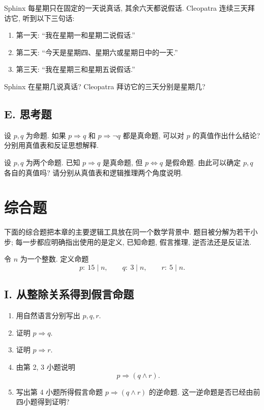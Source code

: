 \documentclass[usesamecnt, thmcnt=section, lang=cn, newtx, 10pt, scheme=chinese]{elegantbook}
\begin{document}
\begin{exercise}
\label{ex:basic-logic-18}
Sphinx 每星期只在固定的一天说真话, 其余六天都说假话. Cleopatra 连续三天拜访它, 听到以下三句话:
\begin{enumerate}[label=\rm(\arabic*)]
  \item 第一天: ``我在星期一和星期二说假话.''
  \item 第二天: ``今天是星期四、星期六或星期日中的一天.''
  \item 第三天: ``我在星期三和星期五说假话.''
\end{enumerate}
Sphinx 在星期几说真话? Cleopatra 拜访它的三天分别是星期几?
\end{exercise}

\subsection*{E. 思考题}

\begin{challenge}
\label{ch:logic-05}
设 $p,q$ 为命题. 如果 $p\Rightarrow q$ 和 $p\Rightarrow\neg q$ 都是真命题, 可以对 $p$ 的真值作出什么结论? 分别用真值表和反证思想解释.
\end{challenge}

\begin{challenge}
\label{ch:logic-06}
设 $p,q$ 为两个命题. 已知 $p\Rightarrow q$ 是真命题, 但 $p\Leftrightarrow q$ 是假命题. 由此可以确定 $p,q$ 各自的真值吗? 请分别从真值表和逻辑推理两个角度说明.
\end{challenge}

\section{综合题}

下面的综合题把本章的主要逻辑工具放在同一个数学背景中. 题目被分解为若干小步; 每一步都应明确指出使用的是定义, 已知命题, 假言推理, 逆否法还是反证法.

令 $n$ 为一个整数. 定义命题
\[
 p:\ 15\mid n,
 \qquad
 q:\ 3\mid n,
 \qquad
 r:\ 5\mid n.
\]

\subsection*{I. 从整除关系得到假言命题}

\begin{enumerate}[label=\textbf{\arabic*.}, series=comprehensive]
  \item 用自然语言分别写出 $p,q,r$.
  \item 证明 $p\Rightarrow q$.
  \item 证明 $p\Rightarrow r$.
  \item 由第 2, 3 小题说明
  \[
    p\Rightarrow(q\wedge r).
  \]
  \item 写出第 4 小题所得假言命题 $p\Rightarrow(q\wedge r)$ 的逆命题. 这一逆命题是否已经由前四小题得到证明?
\end{enumerate}
\end{document}

